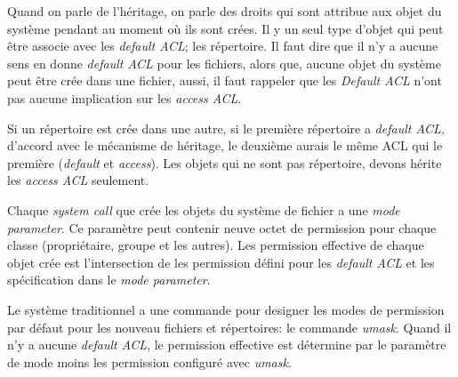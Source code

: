 Quand on parle de l'héritage, on parle des droits qui sont attribue aux objet du système pendant au moment où ils sont crées. Il y un seul type d'objet qui peut être associe avec les \emph{default ACL}; les répertoire. Il faut dire que il n'y a aucune sens en donne \emph{default ACL } pour les fichiers, alors que, aucune objet du système peut être crée dans une fichier, aussi, il faut rappeler que les \emph{Default ACL} n'ont pas aucune implication sur les \emph{access ACL}.
 
Si un répertoire est crée dans une autre, si le première répertoire a \emph{default ACL}, d'accord avec le mécanisme de héritage, le deuxième aurais le même ACL qui le première (\emph{default} et \emph{access}). Les objets qui ne sont pas répertoire, devons hérite les \emph{access ACL} seulement.
 
Chaque \emph{system call} que crée les objets du système de fichier a une \emph{mode parameter}. Ce paramètre peut contenir neuve octet de permission pour chaque classe (propriétaire, groupe et les autres). Les permission effective de chaque objet crée est l'intersection de les permission défini pour les \emph{default ACL} et les spécification dans le \emph{mode parameter}.
 
Le système traditionnel a une commande pour designer les modes de permission par défaut pour les nouveau fichiers et répertoires: le commande \emph{umask}. Quand il n'y a aucune \emph{default ACL}, le permission effective est détermine par le paramètre de mode moins les permission configuré avec \emph{umask}.
 
